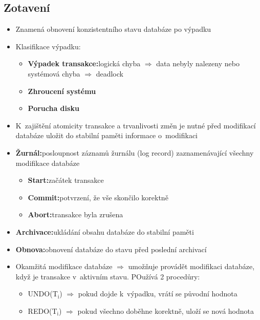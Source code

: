 \documentclass[a4paper,10pt]{article}
\newcommand{\pojem}[2]{\item \textbf{#1:}\quad #2}
\newcommand{\tedy}{$\Rightarrow$ }
\begin{document}
		\subsection{Zotavení}
			\begin{itemize}
				\item Znamená obnovení konzistentního stavu databáze po výpadku
				\item Klasifikace výpadku:
				\begin{itemize}
					\pojem{Výpadek transakce}{logická chyba \tedy data nebyly nalezeny nebo systémová chyba \tedy deadlock}
					\item \textbf{Zhroucení systému}
					\item \textbf{Porucha disku}
				\end{itemize}
				\item K~zajištění atomicity transakce a trvanlivosti změn je nutné před modifikací databáze uložit do stabilní paměti informace o~modifikaci
				\pojem{Žurnál}{posloupnost záznamů žurnálu (log record) zaznamenávající všechny modifikace databáze}
				\begin{itemize}
					\pojem{Start}{začátek transakce}
					\pojem{Commit}{potvrzení, že vše skončilo korektně}
					\pojem{Abort}{transakce byla zrušena}
				\end{itemize}
				\pojem{Archivace}{ukládání obsahu databáze do stabilní paměti}
				\pojem{Obnova}{obnovení databáze do stavu před poslední archivací}
				\item Okamžitá modifikace databáze \tedy umožňuje provádět modifikaci databáze, když je transakce v~aktivním stavu. POužívá 2 procedůry:
				\begin{itemize}
					\item UNDO(T$_\textrm{i}$) \tedy pokud dojde k~výpadku, vrátí se původní hodnota
					\item REDO(T$_\textrm{i}$) \tedy pokud všechno doběhne korektně, uloží se nová hodnota
				\end{itemize}
			\end{itemize}
			\begin{figure}[h!]
				\centering
			\end{figure}
\end{document}
